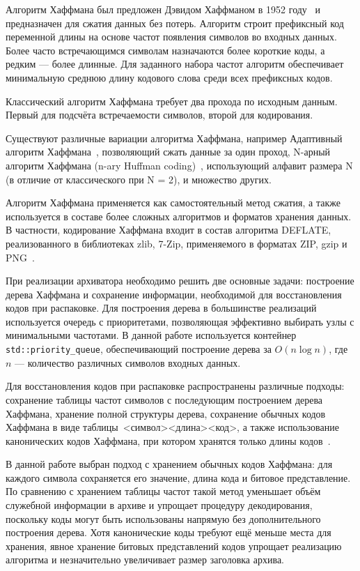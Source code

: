 \documentclass[a4paper]{article}
\begin{document}
Алгоритм Хаффмана был предложен Дэвидом Хаффманом в 1952 году~\cite{1} и предназначен для сжатия данных без потерь. Алгоритм строит префиксный код переменной длины на основе частот появления символов во входных данных. Более часто встречающимся символам назначаются более короткие коды, а редким --- более длинные. Для заданного набора частот алгоритм обеспечивает минимальную среднюю длину кодового слова среди всех префиксных кодов.

Классический алгоритм Хаффмана требует два прохода по исходным данным. Первый для подсчёта встречаемости символов, второй для кодирования.

Существуют различные вариации алгоритма Хаффмана, например Адаптивный алгоритм Хаффмана~\cite{2}, позволяющий сжать данные за один проход, N-арный алгоритм Хаффмана (n-ary Huffman coding)~\cite{1}, использующий алфавит размера N (в отличие от классического при N = 2), и множество других.

Алгоритм Хаффмана применяется как самостоятельный метод сжатия, а также используется в составе более сложных алгоритмов и форматов хранения данных. В частности, кодирование Хаффмана входит в состав алгоритма DEFLATE, реализованного в библиотеках zlib, 7-Zip, применяемого в форматах ZIP, gzip и PNG~\cite{3}.

При реализации архиватора необходимо решить две основные задачи: построение дерева Хаффмана и сохранение информации, необходимой для восстановления кодов при распаковке. Для построения дерева в большинстве реализаций используется очередь с приоритетами, позволяющая эффективно выбирать узлы с минимальными частотами. В данной работе используется контейнер \texttt{std::priority\_queue}, обеспечивающий построение дерева за $O(n \log n)$, где $n$ --- количество различных символов входных данных.

Для восстановления кодов при распаковке распространены различные подходы: сохранение таблицы частот символов с последующим построением дерева Хаффмана, хранение полной структуры дерева, сохранение обычных кодов Хаффмана в виде таблицы~\mbox{<символ><длина><код>}, а также использование канонических кодов Хаффмана, при котором хранятся только длины кодов~\cite{1}.

В данной работе выбран подход с хранением обычных кодов Хаффмана: для каждого символа сохраняется его значение, длина кода и битовое представление. По сравнению с хранением таблицы частот такой метод уменьшает объём служебной информации в архиве и упрощает процедуру декодирования, поскольку коды могут быть использованы напрямую без дополнительного построения дерева.
Хотя канонические коды требуют ещё меньше места для хранения, явное хранение битовых представлений кодов упрощает реализацию алгоритма и незначительно увеличивает размер заголовка архива.
\end{document}

